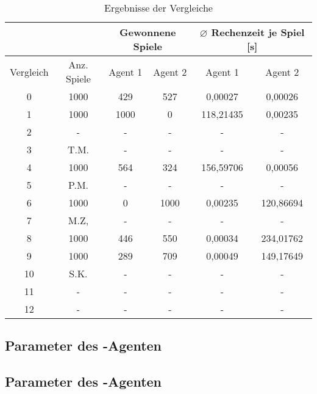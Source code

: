 \begin{table}[ht]
\begin{center}
\begin{tabular}{| c | c | c | c | c | c |} \hline
 &  & \multicolumn{2}{|c|}{Gewonnene Spiele} & \multicolumn{2}{|c|}{$\varnothing$ Rechenzeit je Spiel [s]} \\ \hline
Vergleich & Anz. Spiele & Agent 1 & Agent 2 & Agent 1 & Agent 2 \\ \hline
\hline
 0 & 1000 & 429  &  527 &   0,00027 &   0,00026 \\ \hline
 \hline
 1 & 1000 & 1000 &    0 & 118,21435 &   0,00235 \\ \hline
 2 & -    & -    & -    & -         & -         \\ \hline
 3 & T.M. & -    & -    & -         & -         \\ \hline
 4 & 1000 &  564 &  324 & 156,59706 &   0,00056 \\ \hline
 5 & P.M. & -    & -    & -         & -         \\ \hline
 \hline
 6 & 1000 &    0 & 1000 &   0,00235 & 120,86694 \\ \hline
 7 & M.Z, & -    & -    & -         & -         \\ \hline
 8 & 1000 &  446 &  550 &   0,00034 & 234,01762 \\ \hline
 9 & 1000 &  289 &  709 &   0,00049 & 149,17649 \\ \hline
10 & S.K. & -    & -    & -         & -         \\ \hline
\hline
11 & -    & -    & -    & -         & -         \\ \hline
12 & -    & -    & -    & -         & -         \\ \hline
\end{tabular}
\end{center}
\caption{Ergebnisse der Vergleiche}
\label{tbl:cmp-results}
\end{table}

\subsection*{Parameter des -Agenten}
\label{eval:agents:params:subsec-mc}

\subsection*{Parameter des -Agenten}
\label{eval:agents:params:subsec-ab}


